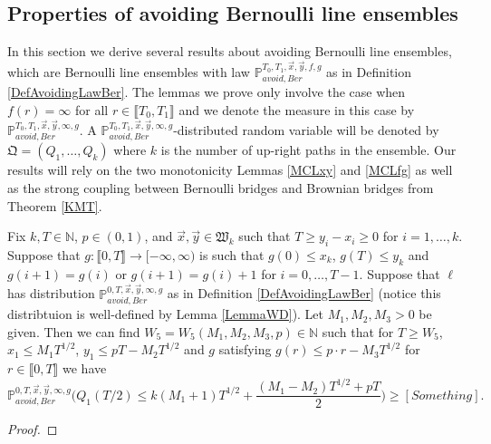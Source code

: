 %
\subsection{Properties of avoiding Bernoulli line ensembles}\label{Section3.3}  In this section we derive several results about avoiding Bernoulli line ensembles, which are Bernoulli line ensembles with law $\mathbb{P}_{avoid, Ber}^{T_0,T_1, \vec{x}, \vec{y}, f, g}$ as in Definition \ref{DefAvoidingLawBer}. The lemmas we prove only involve the case when $f(r) = \infty$ for all $r \in \llbracket T_0, T_1 \rrbracket$ and we denote the measure in this case by $\mathbb{P}_{avoid, Ber}^{T_0,T_1, \vec{x}, \vec{y}, \infty, g}$. A $\mathbb{P}_{avoid, Ber}^{T_0,T_1, \vec{x}, \vec{y}, \infty, g}$-distributed random variable will be denoted by $\mathfrak{Q} = (Q_1, \dots, Q_k)$ where $k$ is the number of up-right paths in the ensemble. Our results will rely on the two monotonicity Lemmas \ref{MCLxy} and \ref{MCLfg} as well as the strong coupling between Bernoulli bridges and Brownian bridges from Theorem \ref{KMT}.


\begin{lemma}\label{LemmaDip}Fix $k, T \in \mathbb{N}$, $p \in (0,1)$, and $\vec{x}, \vec{y} \in \mathfrak{W}_k$ such that $T \geq y_i-x_i \geq 0$ for $i = 1, \dots, k$. Suppose that $g: \llbracket 0, T \rrbracket \rightarrow [-\infty, \infty)$ is such that $g(0) \leq x_k$, $g(T) \leq y_k$ and $g(i +1 ) = g(i) $ or $g(i+1) = g(i) +1$ for $i = 0, \dots, T-1$. Suppose that $\ell$ has distribution $\mathbb{P}^{0,T,\vec{x},\vec{y}, \infty ,g}_{avoid,Ber}$ as in Definition \ref{DefAvoidingLawBer} (notice this distribtuion is well-defined by Lemma \ref{LemmaWD}). Let $M_1,M_2, M_3 > 0$ be given. Then we can find $W_5 = W_5(M_1,M_2, M_3, p) \in \mathbb{N}$ such that for $T \geq W_5$, $ x_1 \leq M_1T^{1/2}$, $ y_1 \leq pT -  M_2 T^{1/2}$ and $g$ satisfying $g(r) \leq p \cdot r - M_3T^{1/2}$ for $r \in \llbracket 0, T\rrbracket$ we have
\begin{equation}\label{eqDip}
\mathbb{P}^{0,T,\vec{x},\vec{y}, \infty ,g}_{avoid,Ber}\bigg( Q_1( T/2 )  \leq k (M_1+1)T^{1/2} +  \frac{ (M_1 - M_2)T^{1/2} + p T}{2}  \bigg) \geq [Something].
\end{equation}
\end{lemma}
\begin{proof}
\end{proof}

